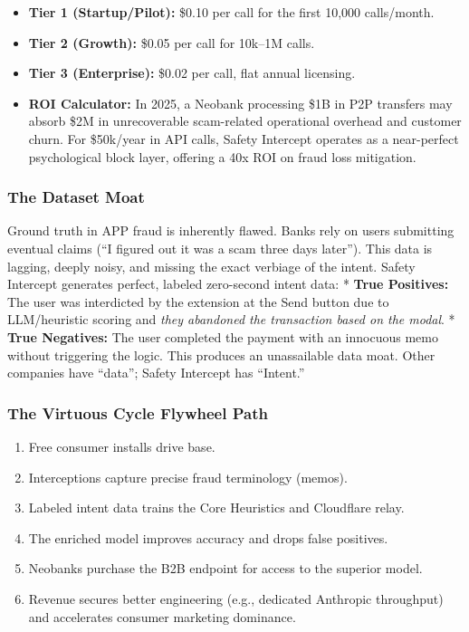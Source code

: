 \documentclass[
]{article}
\providecommand{\tightlist}{%
  \setlength{\itemsep}{0pt}\setlength{\parskip}{0pt}}
\begin{document}
\begin{itemize}
\tightlist
\item
  \textbf{Tier 1 (Startup/Pilot):} \$0.10 per call for the first 10,000
  calls/month.
\item
  \textbf{Tier 2 (Growth):} \$0.05 per call for 10k--1M calls.
\item
  \textbf{Tier 3 (Enterprise):} \$0.02 per call, flat annual licensing.
\item
  \textbf{ROI Calculator:} In 2025, a Neobank processing \$1B in P2P
  transfers may absorb \$2M in unrecoverable scam-related operational
  overhead and customer churn. For \$50k/year in API calls, Safety
  Intercept operates as a near-perfect psychological block layer,
  offering a 40x ROI on fraud loss mitigation.
\end{itemize}

\subsubsection{The Dataset Moat}\label{the-dataset-moat}

Ground truth in APP fraud is inherently flawed. Banks rely on users
submitting eventual claims (``I figured out it was a scam three days
later''). This data is lagging, deeply noisy, and missing the exact
verbiage of the intent. Safety Intercept generates perfect, labeled
zero-second intent data: * \textbf{True Positives:} The user was
interdicted by the extension at the Send button due to LLM/heuristic
scoring and \emph{they abandoned the transaction based on the modal}. *
\textbf{True Negatives:} The user completed the payment with an
innocuous memo without triggering the logic. This produces an
unassailable data moat. Other companies have ``data''; Safety Intercept
has ``Intent.''

\subsubsection{The Virtuous Cycle Flywheel
Path}\label{the-virtuous-cycle-flywheel-path}

\begin{enumerate}
\def\labelenumi{\arabic{enumi}.}
\tightlist
\item
  Free consumer installs drive base.
\item
  Interceptions capture precise fraud terminology (memos).
\item
  Labeled intent data trains the Core Heuristics and Cloudflare relay.
\item
  The enriched model improves accuracy and drops false positives.
\item
  Neobanks purchase the B2B endpoint for access to the superior model.
\item
  Revenue secures better engineering (e.g., dedicated Anthropic
  throughput) and accelerates consumer marketing dominance.
\end{enumerate}
\end{document}
